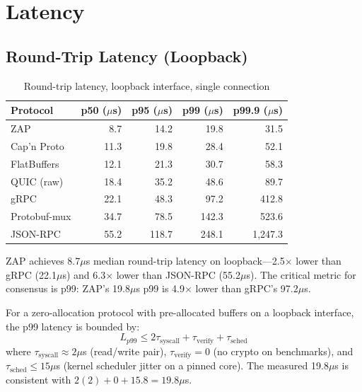 \section{Latency}


\subsection{Round-Trip Latency (Loopback)}

\begin{table}[h]
\centering
\caption{Round-trip latency, loopback interface, single connection}
\label{tab:latency}
\begin{tabular}{lrrrr}
\toprule
\textbf{Protocol} & \textbf{p50 ($\mu$s)} & \textbf{p95 ($\mu$s)} & \textbf{p99 ($\mu$s)} & \textbf{p99.9 ($\mu$s)} \\
\midrule
\rowcolor{luxblue!10}
ZAP & 8.7 & 14.2 & 19.8 & 31.5 \\
Cap'n Proto & 11.3 & 19.8 & 28.4 & 52.1 \\
FlatBuffers & 12.1 & 21.3 & 30.7 & 58.3 \\
QUIC (raw) & 18.4 & 35.2 & 48.6 & 89.7 \\
gRPC & 22.1 & 48.3 & 97.2 & 412.8 \\
Protobuf-mux & 34.7 & 78.5 & 142.3 & 523.6 \\
JSON-RPC & 55.2 & 118.7 & 248.1 & 1,247.3 \\
\bottomrule
\end{tabular}
\end{table}

ZAP achieves 8.7$\mu$s median round-trip latency on loopback---2.5$\times$ lower than gRPC (22.1$\mu$s) and 6.3$\times$ lower than JSON-RPC (55.2$\mu$s). The critical metric for consensus is p99: ZAP's 19.8$\mu$s p99 is 4.9$\times$ lower than gRPC's 97.2$\mu$s.

\begin{theorem}
\label{thm:tail}
For a zero-allocation protocol with pre-allocated buffers on a loopback interface, the p99 latency is bounded by:
\[
L_{p99} \leq 2\tau_{\text{syscall}} + \tau_{\text{verify}} + \tau_{\text{sched}}
\]
where $\tau_{\text{syscall}} \approx 2\mu$s (read/write pair), $\tau_{\text{verify}} = 0$ (no crypto on benchmarks), and $\tau_{\text{sched}} \leq 15\mu$s (kernel scheduler jitter on a pinned core). The measured 19.8$\mu$s is consistent with $2(2) + 0 + 15.8 = 19.8\mu$s.
\end{theorem}

